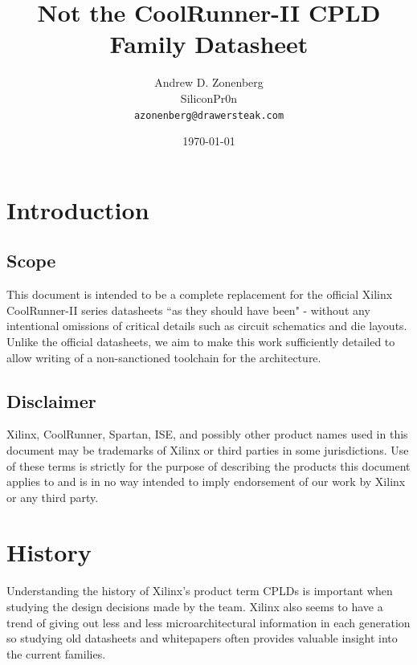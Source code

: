 \documentclass[pdftex,letterpaper]{article}
\begin{document}
\pagestyle{fancy}

\title{Not the CoolRunner-II CPLD Family Datasheet}
\author{Andrew D. Zonenberg\\
	SiliconPr0n \\
	\texttt{azonenberg@drawersteak.com}}
\date{\today}
\maketitle

\section{Introduction}

\subsection{Scope}

This document is intended to be a complete replacement for the official Xilinx CoolRunner-II series datasheets ``as they 
should have been" - without any intentional omissions of critical details such as circuit schematics and die layouts. 
Unlike the official datasheets, we aim to make this work sufficiently detailed to allow writing of a non-sanctioned 
toolchain for the architecture.

\subsection{Disclaimer}

Xilinx, CoolRunner, Spartan, ISE, and possibly other product names used in this document may be trademarks of Xilinx 
or third parties in some jurisdictions. Use of these terms is strictly for the purpose of describing the products 
this document applies to and is in no way intended to imply endorsement of our work by Xilinx or any third party.

\pagebreak
\tableofcontents
\pagebreak

\section{History}

Understanding the history of Xilinx's product term CPLDs is important when studying the design decisions made by the 
team. Xilinx also seems to have a trend of giving out less and less microarchitectural information in each 
generation so studying old datasheets and whitepapers often provides valuable insight into the current families.
\end{document}
